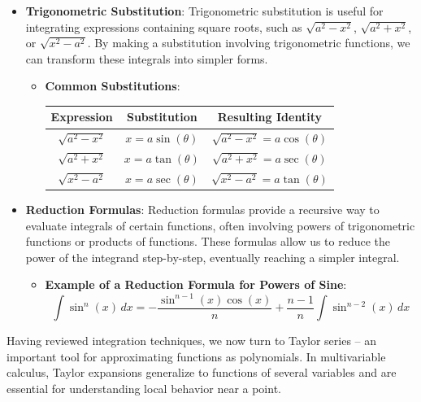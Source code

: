 \begin{itemize}
\item \textbf{Trigonometric Substitution}: 
Trigonometric substitution is useful for integrating expressions containing square roots, such as \( \sqrt{a^2 - x^2} \), \( \sqrt{a^2 + x^2} \), or \( \sqrt{x^2 - a^2} \). By making a substitution involving trigonometric functions, we can transform these integrals into simpler forms.

    \begin{itemize}
    \item \textbf{Common Substitutions}:
\vspace{1em}
        \begin{center}
        \begin{tabular}{|c|c|c|}
        \hline
        Expression & Substitution & Resulting Identity \\
        \hline
        \( \sqrt{a^2 - x^2} \) & \( x = a \sin(\theta) \) & \( \sqrt{a^2 - x^2} = a \cos(\theta) \) \\
        \( \sqrt{a^2 + x^2} \) & \( x = a \tan(\theta) \) & \( \sqrt{a^2 + x^2} = a \sec(\theta) \) \\
        \( \sqrt{x^2 - a^2} \) & \( x = a \sec(\theta) \) & \( \sqrt{x^2 - a^2} = a \tan(\theta) \) \\
        \hline
        \end{tabular}
        \end{center}
\vspace{1em}
    \end{itemize}

\item \textbf{Reduction Formulas}: 
Reduction formulas provide a recursive way to evaluate integrals of certain functions, often involving powers of trigonometric functions or products of functions. These formulas allow us to reduce the power of the integrand step-by-step, eventually reaching a simpler integral.

    \begin{itemize}
    \item \textbf{Example of a Reduction Formula for Powers of Sine}:
        \[
        \int \sin^n(x) \, dx = -\frac{\sin^{n-1}(x) \cos(x)}{n} + \frac{n-1}{n} \int \sin^{n-2}(x) \, dx
        \]
    \end{itemize}
\end{itemize}

\noindent Having reviewed integration techniques, we now turn to Taylor series -- an important tool for approximating functions as polynomials. In multivariable calculus, Taylor expansions generalize to functions of several variables and are essential for understanding local behavior near a point.\\ \\

